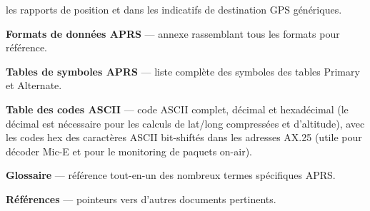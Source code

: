 \begin{aprsbodyblock}
\begin{list}{}{\setlength{\leftmargin}{0pt}\setlength{\rightmargin}{0pt}\setlength{\itemindent}{0pt}\setlength{\labelwidth}{0pt}\setlength{\labelsep}{0pt}\setlength{\itemsep}{0.35em}\setlength{\parsep}{0pt}}
  les rapports de position et dans les indicatifs de destination GPS
  génériques.
\item
  \textbf{Formats de données APRS} --- annexe rassemblant tous les
  formats pour référence.
\item
  \textbf{Tables de symboles APRS} --- liste complète des symboles des
  tables Primary et Alternate.
\item
  \textbf{Table des codes ASCII} --- code ASCII complet, décimal et
  hexadécimal (le décimal est nécessaire pour les calculs de lat/long
  compressées et d'altitude), avec les codes hex des caractères ASCII
  bit-shiftés dans les adresses AX.25 (utile pour décoder Mic-E et pour
  le monitoring de paquets on-air).
\item
  \textbf{Glossaire} --- référence tout-en-un des nombreux termes
  spécifiques APRS.
\item
  \textbf{Références} --- pointeurs vers d'autres documents pertinents.
\end{list}
\end{aprsbodyblock}
